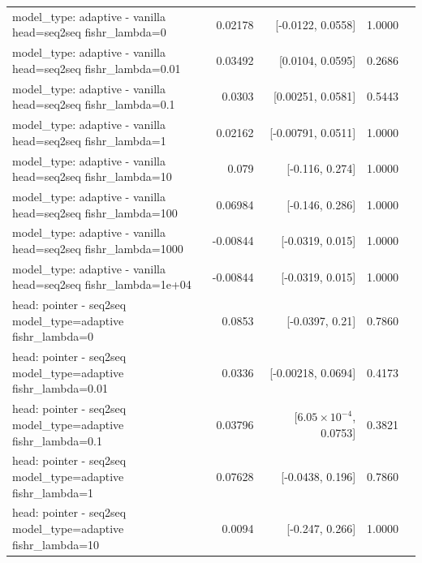 \documentclass[10pt]{article}
\makeatletter
\newcommand{\stackcell}[1]{\begin{tabular}[t]{@{}l@{}}#1\end{tabular}}
\makeatother
\begin{document}
{\begin{longtable}{lrrrl}
\stackcell{model\_type: adaptive - vanilla\\\footnotesize head=seq2seq fishr\_lambda=0 } & 0.02178 & [-0.0122, 0.0558] & 1.0000 & \\
\stackcell{model\_type: adaptive - vanilla\\\footnotesize head=seq2seq fishr\_lambda=0.01 } & 0.03492 & [0.0104, 0.0595] & 0.2686 & \\
\stackcell{model\_type: adaptive - vanilla\\\footnotesize head=seq2seq fishr\_lambda=0.1 } & 0.0303 & [0.00251, 0.0581] & 0.5443 & \\
\stackcell{model\_type: adaptive - vanilla\\\footnotesize head=seq2seq fishr\_lambda=1 } & 0.02162 & [-0.00791, 0.0511] & 1.0000 & \\
\stackcell{model\_type: adaptive - vanilla\\\footnotesize head=seq2seq fishr\_lambda=10 } & 0.079 & [-0.116, 0.274] & 1.0000 & \\
\stackcell{model\_type: adaptive - vanilla\\\footnotesize head=seq2seq fishr\_lambda=100 } & 0.06984 & [-0.146, 0.286] & 1.0000 & \\
\stackcell{model\_type: adaptive - vanilla\\\footnotesize head=seq2seq fishr\_lambda=1000 } & -0.00844 & [-0.0319, 0.015] & 1.0000 & \\
\stackcell{model\_type: adaptive - vanilla\\\footnotesize head=seq2seq fishr\_lambda=1e+04 } & -0.00844 & [-0.0319, 0.015] & 1.0000 & \\
\stackcell{head: pointer - seq2seq\\\footnotesize model\_type=adaptive fishr\_lambda=0 } & 0.0853 & [-0.0397, 0.21] & 0.7860 & \\
\stackcell{head: pointer - seq2seq\\\footnotesize model\_type=adaptive fishr\_lambda=0.01 } & 0.0336 & [-0.00218, 0.0694] & 0.4173 & \\
\stackcell{head: pointer - seq2seq\\\footnotesize model\_type=adaptive fishr\_lambda=0.1 } & 0.03796 & [$6.05\times10^{-4}$, 0.0753] & 0.3821 & \\
\stackcell{head: pointer - seq2seq\\\footnotesize model\_type=adaptive fishr\_lambda=1 } & 0.07628 & [-0.0438, 0.196] & 0.7860 & \\
\stackcell{head: pointer - seq2seq\\\footnotesize model\_type=adaptive fishr\_lambda=10 } & 0.0094 & [-0.247, 0.266] & 1.0000 & \\

\end{longtable}}
\end{document}

